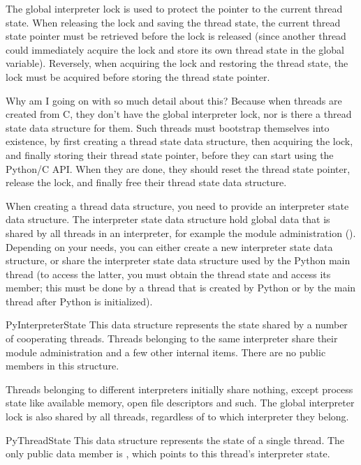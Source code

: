 \documentclass{manual}
\begin{document}
The global interpreter lock is used to protect the pointer to the
current thread state.  When releasing the lock and saving the thread
state, the current thread state pointer must be retrieved before the
lock is released (since another thread could immediately acquire the
lock and store its own thread state in the global variable).
Reversely, when acquiring the lock and restoring the thread state, the
lock must be acquired before storing the thread state pointer.

Why am I going on with so much detail about this?  Because when
threads are created from C, they don't have the global interpreter
lock, nor is there a thread state data structure for them.  Such
threads must bootstrap themselves into existence, by first creating a
thread state data structure, then acquiring the lock, and finally
storing their thread state pointer, before they can start using the
Python/C API.  When they are done, they should reset the thread state
pointer, release the lock, and finally free their thread state data
structure.

When creating a thread data structure, you need to provide an
interpreter state data structure.  The interpreter state data
structure hold global data that is shared by all threads in an
interpreter, for example the module administration
().  Depending on your needs, you can either create
a new interpreter state data structure, or share the interpreter state
data structure used by the Python main thread (to access the latter,
you must obtain the thread state and access its  member;
this must be done by a thread that is created by Python or by the main
thread after Python is initialized).


\begin{ctypedesc}{PyInterpreterState}
This data structure represents the state shared by a number of
cooperating threads.  Threads belonging to the same interpreter
share their module administration and a few other internal items.
There are no public members in this structure.

Threads belonging to different interpreters initially share nothing,
except process state like available memory, open file descriptors and
such.  The global interpreter lock is also shared by all threads,
regardless of to which interpreter they belong.
\end{ctypedesc}

\begin{ctypedesc}{PyThreadState}
This data structure represents the state of a single thread.  The only
public data member is ,
which points to this thread's interpreter state.
\end{ctypedesc}
\end{document}
